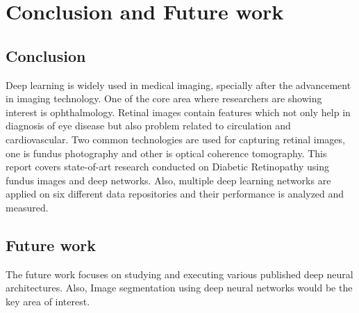 \documentclass[12pt,a4paper,titlepage]{report}
\begin{document}
\chapter{Conclusion and Future work}

\section{Conclusion}
Deep learning is widely used in medical imaging, specially after the advancement in imaging technology. One of the core area where researchers are showing interest is ophthalmology. Retinal images contain features which not only help in diagnosis of eye disease but also problem related to circulation and cardiovascular. Two common technologies are used for capturing retinal images, one is fundus photography and other is optical coherence tomography. This report covers state-of-art research conducted on Diabetic Retinopathy using fundus images and deep networks. Also, multiple deep learning networks are applied on six different data repositories and their performance is analyzed and measured.

\section{Future work}
The future work focuses on studying and executing various published deep neural architectures. Also, Image segmentation using deep neural networks would be the key area of interest.   



\end{document}

